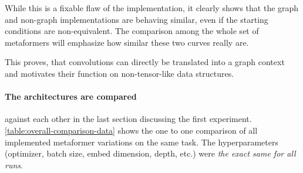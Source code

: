 While this is a fixable flaw of the implementation, it clearly shows that the graph and non-graph implementations are behaving similar, even if the starting conditions are non-equivalent.
The comparison among the whole set of metaformers will emphasize how similar these two curves really are.

This proves, that convolutions can directly be translated into a graph context and motivates their function on non-tensor-like data structures.

\FloatBarrier
\paragraph{The architectures are compared} against each other in the last section discussing the first experiment. 
\autoref{table:overall-comparison-data} shows the one to one comparison of all implemented metaformer variations on the same task.
The hyperparameters (optimizer, batch size, embed dimension, depth, etc.) were \emph{the exact same for all runs}. 



